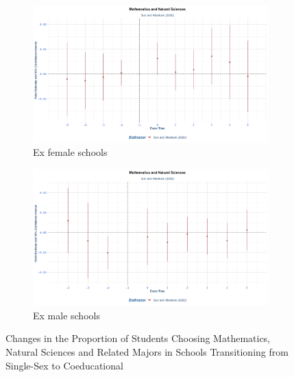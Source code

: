 \begin{figure}[H]
    \centering
    \begin{subfigure}[b]{0.45\textwidth}
        \centering
        \includegraphics[width=\textwidth]{Graph/Results/stagered_ex_females_MATHEMATICS_NATURAL_SCIENCES.png}
        \caption{Ex female schools }
        \label{fig:staggered_females_math_natural_sciences}
    \end{subfigure}
    \hfill
    \begin{subfigure}[b]{0.45\textwidth}
        \centering
        \includegraphics[width=\textwidth]{Graph/Results/stagered_ex_males_MATHEMATICS_NATURAL_SCIENCES.png}
        \caption{Ex male schools }
        \label{fig:staggered_males_math_natural_sciences}
    \end{subfigure}
\caption{ Changes in the Proportion of Students Choosing Mathematics, Natural Sciences and Related Majors   in Schools Transitioning from Single-Sex to Coeducational}
    \label{fig:staggered_math_natural_sciences}
\end{figure}


